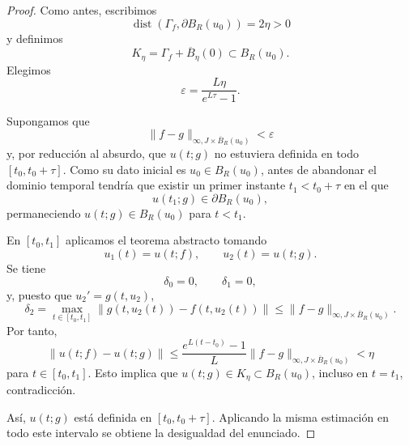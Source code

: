 \begin{proof}
    Como antes, escribimos
    \[
        \operatorname{dist}(\Gamma_f,\partial B_R(u_0))=2\eta>0
    \]
    y definimos
    \[
        K_\eta=\Gamma_f+\overline{B}_\eta(0)\subset B_R(u_0).
    \]
    Elegimos
    \[
        \varepsilon=\frac{L\eta}{e^{L\tau}-1}.
    \]

    \begin{center}
    \end{center}

    Supongamos que
    \[
        \|f-g\|_{\infty,J\times\overline{B}_R(u_0)}<\varepsilon
    \]
    y, por reducción al absurdo, que $u(t;g)$ no estuviera definida en todo $[t_0,t_0+\tau]$. Como su dato inicial es $u_0\in B_R(u_0)$, antes de abandonar el dominio temporal tendría que existir un primer instante $t_1<t_0+\tau$ en el que
    \[
        u(t_1;g)\in\partial B_R(u_0),
    \]
    permaneciendo $u(t;g)\in B_R(u_0)$ para $t<t_1$.

    En $[t_0,t_1]$ aplicamos el teorema abstracto tomando
    \[
        u_1(t)=u(t;f),\qquad u_2(t)=u(t;g).
    \]
    Se tiene
    \[
        \delta_0=0,\qquad \delta_1=0,
    \]
    y, puesto que $u_2'=g(t,u_2)$,
    \[
        \delta_2
        =\max_{t\in[t_0,t_1]}
        \|g(t,u_2(t))-f(t,u_2(t))\|
        \leq\|f-g\|_{\infty,J\times\overline{B}_R(u_0)}.
    \]
    Por tanto,
    \[
        \|u(t;f)-u(t;g)\|
        \leq
        \frac{e^{L(t-t_0)}-1}{L}
        \|f-g\|_{\infty,J\times\overline{B}_R(u_0)}
        <\eta
    \]
    para $t\in[t_0,t_1]$. Esto implica que $u(t;g)\in K_\eta\subset B_R(u_0)$, incluso en $t=t_1$, contradicción.

    Así, $u(t;g)$ está definida en $[t_0,t_0+\tau]$. Aplicando la misma estimación en todo este intervalo se obtiene la desigualdad del enunciado.

    \end{proof}

